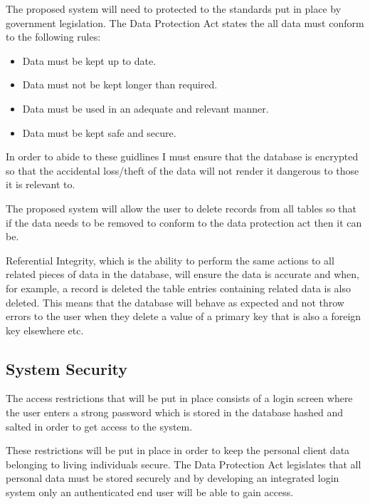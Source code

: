 \begin{flushleft}

The proposed system will need to protected to the standards put in place by government legislation. The Data Protection Act states the all data must conform to the following rules:

\begin{itemize}
\item Data must be kept up to date.
\item Data must not be kept longer than required.
\item Data must be used in an adequate and relevant manner.
\item Data must be kept safe and secure.
\end{itemize}

In order to abide to these guidlines I must ensure that the database is encrypted so that the accidental loss/theft of the data will not render it dangerous to those it is relevant to.

The proposed system will allow the user to delete records from all tables so that if the data needs to be removed to conform to the data protection act then it can be.

Referential Integrity, which is the ability to perform the same actions to all related pieces of data in the database, will ensure the data is accurate and when, for example, a record is deleted the table entries containing related data is also deleted. This means that the database will behave as expected and not throw errors to the user when they delete a value of a primary key that is also a foreign key elsewhere etc.

\end{flushleft}
\subsection{System Security}

\begin{flushleft}
The access restrictions that will be put in place consists of a login screen where the user enters a strong password which is stored in the database hashed and salted in order to get access to the system.

These restrictions will be put in place in order to keep the personal client data belonging to living individuals secure. The Data Protection Act legislates that all personal data must be stored securely and by developing an integrated login system only an authenticated end user will be able to gain access.

\end{flushleft}

